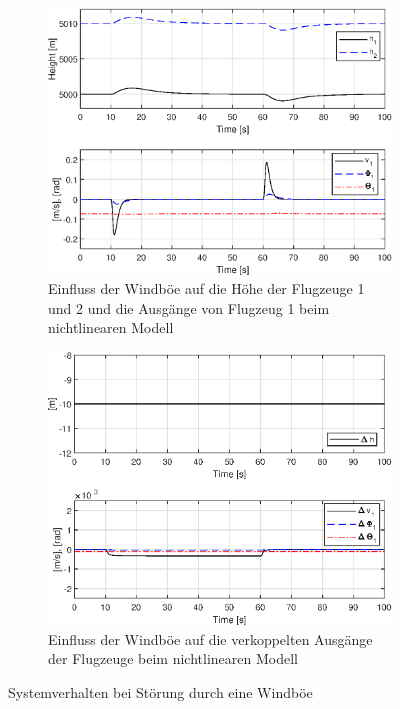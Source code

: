 \begin{figure}[H] %
	\centering
	\begin{subfigure}{0.49\textwidth}
		\centering
		\includegraphics[width=\linewidth]{./Bilder/outputs_y1_windboe.eps}
		\caption{Einfluss der Windböe auf die Höhe der Flugzeuge 1 und 2 und die Ausgänge von Flugzeug 1 beim nichtlinearen Modell}
		\label{fig:outputs_y1_windboe}
	\end{subfigure}
	\hfill
	\begin{subfigure}{0.49\textwidth}
		\centering
		\includegraphics[width=\linewidth]{./Bilder/outputs_ycoupl_windboe.eps}
		\caption{Einfluss der Windböe auf die verkoppelten Ausgänge der Flugzeuge beim nichtlinearen Modell}
		\label{fig:outputs_ycoupl_windboe}
	\end{subfigure}
	\caption{Systemverhalten bei Störung durch eine Windböe}
	\label{fig:outputs_windboe}
\end{figure} 

